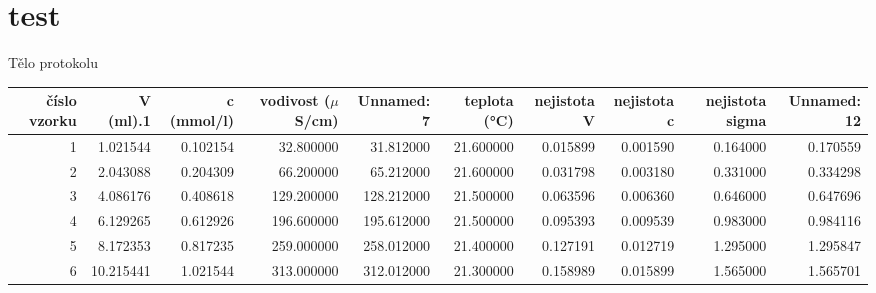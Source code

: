 \documentclass{../concepts/prepareprotokol} %
\begin{document}
\maketitle

\section{test}
Tělo protokolu

\begin{tabular}{rrrrrrrrrr}
    \toprule
    číslo vzorku & V (ml).1 & c (mmol/l) & vodivost ($\mu$ S/cm) & Unnamed: 7 & teplota (°C) & nejistota V & nejistota c & nejistota sigma & Unnamed: 12 \\
    \midrule
    1 & 1.021544 & 0.102154 & 32.800000 & 31.812000 & 21.600000 & 0.015899 & 0.001590 & 0.164000 & 0.170559 \\
    2 & 2.043088 & 0.204309 & 66.200000 & 65.212000 & 21.600000 & 0.031798 & 0.003180 & 0.331000 & 0.334298 \\
    3 & 4.086176 & 0.408618 & 129.200000 & 128.212000 & 21.500000 & 0.063596 & 0.006360 & 0.646000 & 0.647696 \\
    4 & 6.129265 & 0.612926 & 196.600000 & 195.612000 & 21.500000 & 0.095393 & 0.009539 & 0.983000 & 0.984116 \\
    5 & 8.172353 & 0.817235 & 259.000000 & 258.012000 & 21.400000 & 0.127191 & 0.012719 & 1.295000 & 1.295847 \\
    6 & 10.215441 & 1.021544 & 313.000000 & 312.012000 & 21.300000 & 0.158989 & 0.015899 & 1.565000 & 1.565701 \\
    \bottomrule
\end{tabular}
\end{document}
